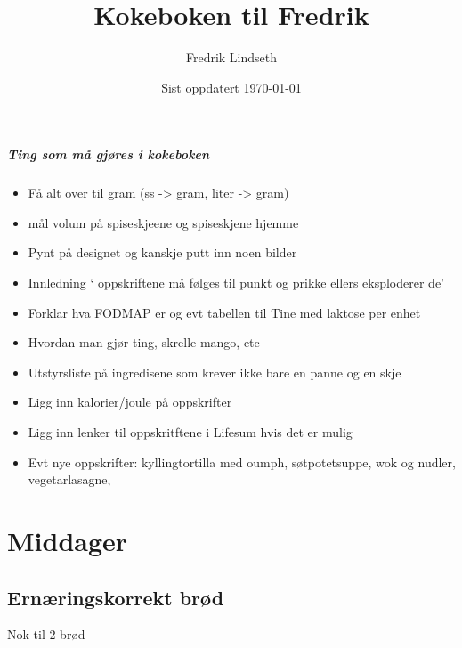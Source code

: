 \documentclass[12pt,a4paper]{book}
\title{Kokeboken til Fredrik}
\author{Fredrik Lindseth}
\date{Sist oppdatert \today}
\begin{document}
\maketitle



\thispagestyle{empty}
\null\newpage

\setcounter{page}{5}

\tableofcontents
\clearpage


\paragraph{Ting som må gjøres i kokeboken}
\begin{itemize}[noitemsep]
  \item Få alt over til gram (ss -> gram, liter -> gram)
  \item mål volum på spiseskjeene og spiseskjene hjemme
  \item Pynt på designet og kanskje putt inn noen bilder
  \item Innledning ` oppskriftene må følges til punkt og prikke ellers eksploderer de'
  \item Forklar hva FODMAP er og evt tabellen til Tine med laktose per enhet
  \item Hvordan man gjør ting, skrelle mango, etc
  \item Utstyrsliste på ingredisene som krever ikke bare en panne og en skje
  \item Ligg inn kalorier/joule på oppskrifter
  \item Ligg inn lenker til oppskritftene i Lifesum hvis det er mulig
  \item Evt nye oppskrifter: kyllingtortilla med oumph, søtpotetsuppe, wok og nudler, vegetarlasagne,
\end{itemize}
 \clearpage

\thispagestyle{empty}
\null\newpage

\setcounter{page}{1}

\chapter{Middager}
\clearpage{}\section{Ernæringskorrekt brød}
Nok til 2 brød
\end{document}
